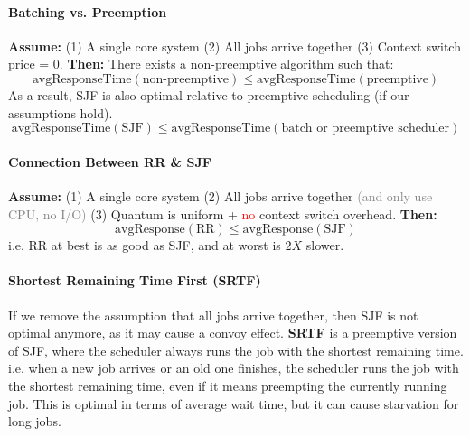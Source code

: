 \documentclass[openany,12pt]{book}
\newcommand{\red}[1]{\textcolor{Red}{#1}}
\newcommand{\gray}[1]{\textcolor{gray}{#1}}
\begin{document}
\begin{samepage}
  \paragraph{Batching vs. Preemption} \textbf{Assume:} (1) A single core system (2) All jobs arrive together (3) Context switch price = 0. \textbf{Then:} There \ul{exists} a non-preemptive algorithm such that:
  \begin{equation*}
    \text{avgResponseTime}(\text{non-preemptive}) \leq \text{avgResponseTime}(\text{preemptive})
  \end{equation*}
  As a result, SJF is also optimal relative to preemptive scheduling (if our assumptions hold).
  \begin{equation*}
    \text{avgResponseTime}(\text{SJF}) \leq \text{avgResponseTime}(\text{batch or preemptive scheduler})
  \end{equation*}
\end{samepage}


\paragraph{Connection Between RR \& SJF} \textbf{Assume:} (1) A single core system (2) All jobs arrive together \gray{(and only use CPU, no I/O)} (3) Quantum is uniform + \red{no} context switch overhead. \textbf{Then:}
\begin{equation*}
  \text{avgResponse}(\text{RR}) \leq \text{avgResponse}(\text{SJF})
\end{equation*}
i.e. RR at best is as good as SJF, and at worst is \(2X\) slower.


\paragraph{Shortest Remaining Time First (SRTF)} If we remove the assumption that all jobs arrive together, then SJF is not optimal anymore, as it may cause a convoy effect. \textbf{SRTF} is a preemptive version of SJF, where the scheduler always runs the job with the shortest remaining time. i.e. when a new job arrives or an old one finishes, the scheduler runs the job with the shortest remaining time, even if it means preempting the currently running job. This is optimal in terms of average wait time, but it can cause starvation for long jobs.
\end{document}
